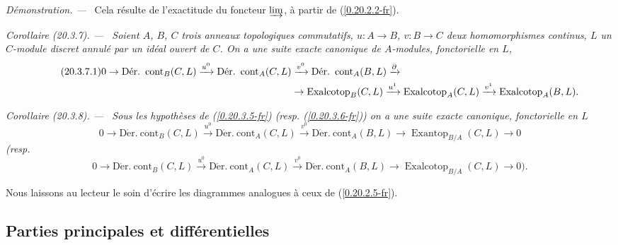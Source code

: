 \documentclass[10pt,oneside]{book}
\makeatletter
\newcommand{\sref}[1]{(\ref{#1})}
\newcommand{\setmanualcurrentlabel}[1]{\def\@currentlabel{#1}}
\newenvironment{corollary}[1][]{%
  \setmanualcurrentlabel{#1}\par\medskip\noindent\itshape Corollaire (#1). ---\ }{\par}
\newenvironment{proof}{%
  \par\medskip\noindent\textit{Démonstration. ---\ }}{\par}
\makeatother
\begin{document}
\begin{proof}
Cela résulte de l'exactitude du foncteur $\varinjlim$, à partir de
\sref{0.20.2.2-fr}.
\end{proof}

\begin{corollary}[20.3.7]
\label{0.20.3.7-fr}
Soient $A$, $B$, $C$ trois anneaux topologiques commutatifs, $u:A\to B$,
$v:B\to C$ deux homomorphismes continus, $L$ un $C$-module discret annulé
par un idéal ouvert de $C$. On a une suite exacte canonique de $A$-modules,
fonctorielle en $L$,
\begin{align}
\tag{20.3.7.1}
\label{0.20.3.7.1-fr}
  0\to\operatorname{D\acute{e}r.\ cont}_B(C,L)\xrightarrow{u^0}
  \operatorname{D\acute{e}r.\ cont}_A(C,L)&\xrightarrow{v^0}
  \operatorname{D\acute{e}r.\ cont}_A(B,L)\xrightarrow{\partial} \\
  &\to\operatorname{Exalcotop}_B(C,L)\xrightarrow{u^1}
  \operatorname{Exalcotop}_A(C,L)\xrightarrow{v^1}
  \operatorname{Exalcotop}_A(B,L). \notag
\end{align}
\end{corollary}

\begin{corollary}[20.3.8]
\label{0.20.3.8-fr}
Sous les hypothèses de \sref{0.20.3.5-fr} (resp.
\sref{0.20.3.6-fr}) on a une suite exacte canonique, fonctorielle en $L$
\begin{equation}
\tag{20.3.8.1}
\label{0.20.3.8.1-fr}
  0\to\operatorname{D\acute{e}r.\ cont}_B(C,L)\xrightarrow{u^0}
  \operatorname{D\acute{e}r.\ cont}_A(C,L)\xrightarrow{v^0}
  \operatorname{D\acute{e}r.\ cont}_A(B,L)\to
  \operatorname{Exantop}_{B/A}(C,L)\to0
\end{equation}
(resp.
\begin{equation}
\tag{20.3.8.2}
\label{0.20.3.8.2-fr}
  0\to\operatorname{D\acute{e}r.\ cont}_B(C,L)\xrightarrow{u^0}
  \operatorname{D\acute{e}r.\ cont}_A(C,L)\xrightarrow{v^0}
  \operatorname{D\acute{e}r.\ cont}_A(B,L)\to
  \operatorname{Exalcotop}_{B/A}(C,L)\to0\text{).}
\end{equation}
\end{corollary}

Nous laissons au lecteur le soin d'écrire les diagrammes analogues à ceux de
\sref{0.20.2.5-fr}.

\subsection{Parties principales et différentielles}
\label{subsection:0.20.4-fr}
\end{document}
